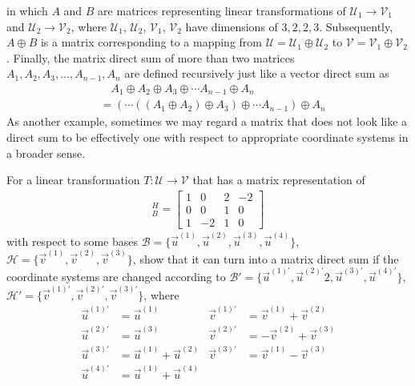 in which $A$ and $B$ are matrices representing linear transformations of $\mathcal{U}_1 \to \mathcal{V}_1$ and $\mathcal{U}_2 \to \mathcal{V}_2$, where $\mathcal{U}_1$, $\mathcal{U}_2$, $\mathcal{V}_1$, $\mathcal{V}_2$ have dimensions of $3,2,2,3$. Subsequently, $A \oplus B$ is a matrix corresponding to a mapping from $\mathcal{U} = \mathcal{U}_1 \oplus \mathcal{U}_2$ to $\mathcal{V} = \mathcal{V}_1 \oplus \mathcal{V}_2$. Finally, the matrix direct sum of more than two matrices $A_1, A_2, A_3, \ldots, A_{n-1}, A_n$ are defined recursively just like a vector direct sum as
\begin{align*}
&\quad A_1 \oplus A_2 \oplus A_3 \oplus \cdots A_{n-1} \oplus A_n \\
&= (\cdots ((A_1 \oplus A_2) \oplus A_3) \oplus \cdots A_{n-1}) \oplus A_n
\end{align*}
As another example, sometimes we may regard a matrix that does not look like a direct sum to be effectively one with respect to appropriate coordinate systems in a broader sense.
\begin{exmp}
For a linear transformation $T: \mathcal{U} \to \mathcal{V}$ that has a matrix representation of
\begin{align*}
[T]_B^H =
\begin{bmatrix}
1 & 0 & 2 & -2 \\
0 & 0 & 1 & 0 \\
1 & -2 & 1 & 0
\end{bmatrix} 
\end{align*}
with respect to some bases $\mathcal{B} = \{\vec{u}^{(1)}, \vec{u}^{(2)}, \vec{u}^{(3)}, \vec{u}^{(4)}\}$, $\mathcal{H} = \{\vec{v}^{(1)}, \vec{v}^{(2)}, \vec{v}^{(3)}\}$, show that it can turn into a matrix direct sum if the coordinate systems are changed according to $\mathcal{B}' = \{\vec{u}^{(1)'}, \vec{u}^{(2)'}2, \vec{u}^{(3)'}, \vec{u}^{(4)'}\}$, $\mathcal{H}' = \{\vec{v}^{(1)'}, \vec{v}^{(2)'}, \vec{v}^{(3)'}\}$, where
\begin{align*}
\vec{u}^{(1)'} &= \vec{u}^{(1)} & \vec{v}^{(1)'} &= \vec{v}^{(1)} + \vec{v}^{(2)} \\
\vec{u}^{(2)'} &= \vec{u}^{(3)} & \vec{v}^{(2)'} &= -\vec{v}^{(2)} + \vec{v}^{(3)} \\
\vec{u}^{(3)'} &= \vec{u}^{(1)} + \vec{u}^{(2)} & \vec{v}^{(3)'} &= \vec{v}^{(1)} - \vec{v}^{(3)} \\
\vec{u}^{(4)'} &= \vec{u}^{(1)} + \vec{u}^{(4)}
\end{align*}
\end{exmp}
